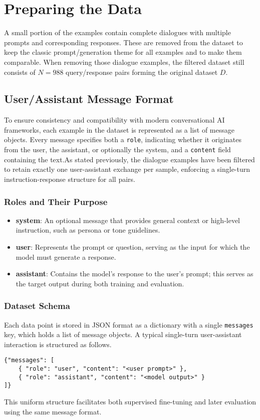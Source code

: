 \section{Preparing the Data}\label{sec:preparing_the_data}
A small portion of the examples contain complete dialogues with multiple prompts and corresponding responses. These are removed from the dataset to keep the classic prompt/generation theme for all examples and to make them comparable. When removing those dialogue examples, the filtered dataset still consists of $N = 988$ query/response pairs forming the original dataset $D$.

\subsection{User/Assistant Message Format}\label{subsec:message_format}
To ensure consistency and compatibility with modern conversational AI frameworks, each example in the dataset is represented as a list of message objects. Every message specifies both a \texttt{role}, indicating whether it originates from the user, the assistant, or optionally the system, and a \texttt{content} field containing the text.As stated previously, the dialogue examples have been filtered to retain exactly one user-assistant exchange per sample, enforcing a single-turn instruction-response structure for all pairs.

\subsubsection{Roles and Their Purpose}
\begin{itemize}
\item \textbf{system}: An optional message that provides general context or high-level instruction, such as persona or tone guidelines.
\item \textbf{user}: Represents the prompt or question, serving as the input for which the model must generate a response.
\item \textbf{assistant}: Contains the model's response to the user's prompt; this serves as the target output during both training and evaluation.
\end{itemize}

\subsubsection{Dataset Schema}
Each data point is stored in JSON format as a dictionary with a single \texttt{messages} key, which holds a list of message objects. A typical single-turn user-assistant interaction is structured as follows.
\begin{lstlisting}[caption={User–assistant message pair}]
{"messages": [
    { "role": "user", "content": "<user prompt>" },
    { "role": "assistant", "content": "<model output>" }
]}
\end{lstlisting}
This uniform structure facilitates both supervised fine-tuning and later evaluation using the same message format.


